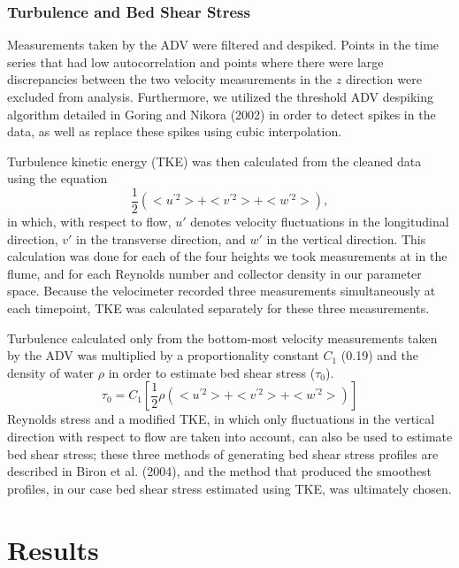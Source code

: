 \documentclass{scrreprt}
\begin{document}
\subsection{Turbulence and Bed Shear Stress}
Measurements taken by the ADV were filtered and despiked. Points in the time series that had low autocorrelation and points where there were large discrepancies between the two velocity measurements in the $z$ direction were excluded from analysis. Furthermore, we utilized the threshold ADV despiking algorithm detailed in Goring and Nikora (2002) in order to detect spikes in the data, as well as replace these spikes using cubic interpolation.

Turbulence kinetic energy (TKE) was then calculated from the cleaned data using the equation 
\[\frac{1}{2}(<u^{'2}> + <v^{'2}> + <w^{'2}>),\]
in which, with respect to flow, $u'$ denotes velocity fluctuations in the longitudinal direction, $v'$ in the transverse direction, and $w'$ in the vertical direction. This calculation was done for each of the four heights we took measurements at in the flume, and for each Reynolds number and collector density in our parameter space. Because the velocimeter recorded three measurements simultaneously at each timepoint, TKE was calculated separately for these three measurements. 

Turbulence calculated only from the bottom-most velocity measurements taken by the ADV was multiplied by a proportionality constant $C_{1}$ (0.19) and the density of water $\rho$ in order to estimate bed shear stress ($\tau_{0}$).
\[\tau_{0} = C_{1}[\frac{1}{2}\rho(<u^{'2}> + <v^{'2}> + <w^{'2}>)]\]
Reynolds stress and a modified TKE, in which only fluctuations in the vertical direction with respect to flow are taken into account, can also be used to estimate bed shear stress; these three methods of generating bed shear stress profiles are described in Biron et al. (2004), and the method that produced the smoothest profiles, in our case bed shear stress estimated using TKE, was ultimately chosen.  


\chapter{Results}
\end{document}
